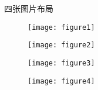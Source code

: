 \documentclass{beamer}
\begin{document}
\begin{frame}{四张图片布局}
    \begin{figure}
        \centering
        \begin{minipage}[b]{0.45\linewidth}
            \texttt{[image: figure1]}
        \end{minipage}
        \hfill
        \begin{minipage}[b]{0.45\linewidth}
            \texttt{[image: figure2]}
        \end{minipage}
        
        \vspace{0.5cm}
        
        \begin{minipage}[b]{0.45\linewidth}
            \texttt{[image: figure3]}
        \end{minipage}
        \hfill
        \begin{minipage}[b]{0.45\linewidth}
            \texttt{[image: figure4]}
        \end{minipage}
    \end{figure}
\end{frame}
\end{document}
